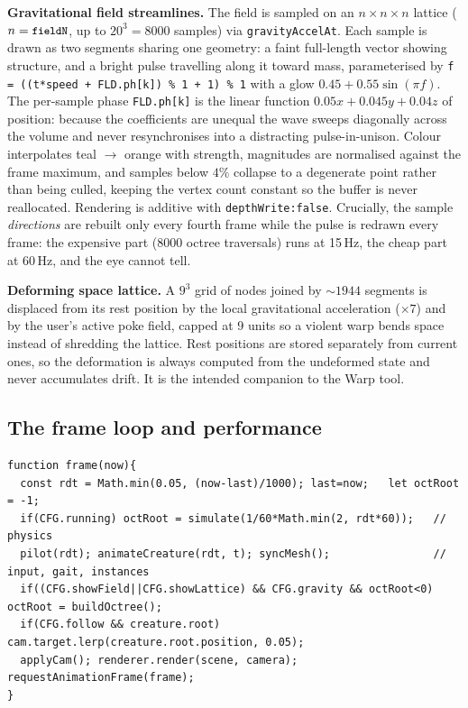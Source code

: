 \documentclass[10pt,a4paper]{article}
\newcommand{\code}[1]{\texttt{\small #1}}
\begin{document}
\textbf{Gravitational field streamlines.} The field is sampled on an $n\times n\times n$ lattice
($n=\code{fieldN}$, up to $20^3=8000$ samples) via \code{gravityAccelAt}. Each sample is drawn as two
segments sharing one geometry: a faint full-length vector showing structure, and a bright pulse travelling
along it toward mass, parameterised by \code{f = ((t*speed + FLD.ph[k]) \% 1 + 1) \% 1} with a glow
$0.45+0.55\sin(\pi f)$. The per-sample phase \code{FLD.ph[k]} is the linear function
$0.05x+0.045y+0.04z$ of position: because the coefficients are unequal the wave sweeps diagonally across the
volume and never resynchronises into a distracting pulse-in-unison. Colour interpolates teal $\to$ orange
with strength, magnitudes are normalised against the frame maximum, and samples below $4\%$ collapse to a
degenerate point rather than being culled, keeping the vertex count constant so the buffer is never
reallocated. Rendering is additive with \code{depthWrite:false}. Crucially, the sample \emph{directions} are
rebuilt only every fourth frame while the pulse is redrawn every frame: the expensive part (8000 octree
traversals) runs at 15\,Hz, the cheap part at 60\,Hz, and the eye cannot tell.

\textbf{Deforming space lattice.} A $9^3$ grid of nodes joined by $\sim1944$ segments is displaced from its
rest position by the local gravitational acceleration ($\times7$) and by the user's active poke field,
capped at 9 units so a violent warp bends space instead of shredding the lattice. Rest positions are stored
separately from current ones, so the deformation is always computed from the undeformed state and never
accumulates drift. It is the intended companion to the Warp tool.

\subsection{The frame loop and performance}
\label{sec:perf}

\begin{lstlisting}
function frame(now){
  const rdt = Math.min(0.05, (now-last)/1000); last=now;   let octRoot = -1;
  if(CFG.running) octRoot = simulate(1/60*Math.min(2, rdt*60));   // physics
  pilot(rdt); animateCreature(rdt, t); syncMesh();                // input, gait, instances
  if((CFG.showField||CFG.showLattice) && CFG.gravity && octRoot<0) octRoot = buildOctree();
  if(CFG.follow && creature.root) cam.target.lerp(creature.root.position, 0.05);
  applyCam(); renderer.render(scene, camera); requestAnimationFrame(frame);
}
\end{lstlisting}
\end{document}
